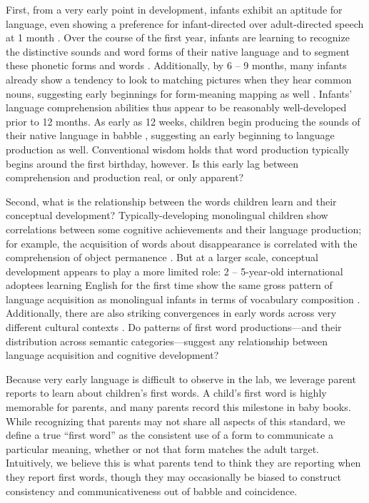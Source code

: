 \documentclass[10pt,letterpaper]{article}
\begin{document}
First, from a very early point in development, infants exhibit an aptitude for language, even showing a preference for infant-directed over adult-directed speech at 1 month \cite{cooper1990}. Over the course of the first year, infants are learning to recognize the distinctive sounds and word forms of their native language \cite{kuhl2004} and to segment these phonetic forms and words \cite{werker2005}. Additionally, by 6 -- 9 months, many infants already show a tendency to look to matching pictures when they hear common nouns, suggesting early beginnings for form-meaning mapping as well \cite{tincoff1999,tincoff2012,bergelson2012}. Infants' language comprehension abilities thus appear to be reasonably well-developed prior to 12 months. As early as 12 weeks, children begin producing the sounds of their native language in babble \cite{kuhl1996}, suggesting an early beginning to language production as well. Conventional wisdom holds that word production typically begins around the first birthday, however. Is this early lag between comprehension and production real, or only apparent?

Second, what is the relationship between the words children learn and their conceptual development? Typically-developing monolingual children show correlations between some cognitive achievements and their language production; for example, the acquisition of words about disappearance is correlated with the comprehension of object permanence \cite{gopnik1986}. But at a larger scale, conceptual development appears to play a more limited role: 2 -- 5-year-old international adoptees learning English for the first time show the same gross pattern of language acquisition as monolingual infants in terms of vocabulary composition \cite{snedeker2007}. Additionally, there are also striking convergences in early words across very different cultural contexts \cite{tardif2007}. Do patterns of first word productions---and their distribution across semantic categories---suggest any relationship between language acquisition and cognitive development? 

Because very early language is difficult to observe in the lab, we leverage parent reports to learn about children's first words. A child's first word is highly memorable for parents, and many parents record this milestone in baby books. While recognizing that parents may not share all aspects of this standard, we define a true ``first word'' as the consistent use of a form to communicate a particular meaning, whether or not that form matches the adult target. Intuitively, we believe this is what parents tend to think they are reporting when they report first words, though they may occasionally be biased to construct consistency and communicativeness out of babble and coincidence.
\end{document}
